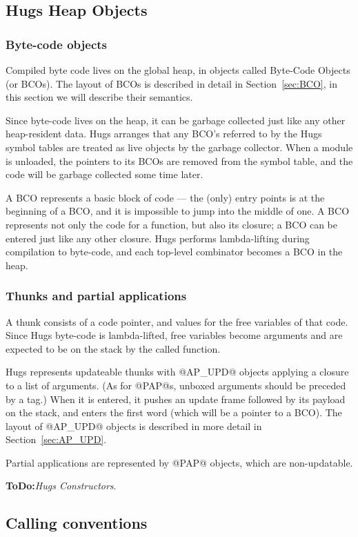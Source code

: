 \documentclass[11pt]{article}
\newcommand{\ToDo}[1]{{{\bf ToDo:}\sl #1}}
\newcommand{\secref}[1]{Section~\ref{sec:#1}}
\newcommand{\Subsection}[2]{\subsection{#1}\label{sec:#2}}
\begin{document}
\Subsection{Hugs Heap Objects}{hugs-heap-objects}

\subsubsection{Byte-code objects}

Compiled byte code lives on the global heap, in objects called
Byte-Code Objects (or BCOs).  The layout of BCOs is described in
detail in \secref{BCO}, in this section we will describe
their semantics.

Since byte-code lives on the heap, it can be garbage collected just
like any other heap-resident data.  Hugs arranges that any BCO's
referred to by the Hugs symbol tables are treated as live objects by
the garbage collector.  When a module is unloaded, the pointers to its
BCOs are removed from the symbol table, and the code will be garbage
collected some time later.

A BCO represents a basic block of code --- the (only) entry points is
at the beginning of a BCO, and it is impossible to jump into the
middle of one.  A BCO represents not only the code for a function, but
also its closure; a BCO can be entered just like any other closure.
Hugs performs lambda-lifting during compilation to byte-code, and each
top-level combinator becomes a BCO in the heap.


\subsubsection{Thunks and partial applications}

A thunk consists of a code pointer, and values for the free variables
of that code.  Since Hugs byte-code is lambda-lifted, free variables
become arguments and are expected to be on the stack by the called
function.

Hugs represents updateable thunks with @AP_UPD@ objects applying a closure
to a list of arguments.  (As for @PAP@s, unboxed arguments should be
preceded by a tag.)  When it is entered, it pushes an update frame
followed by its payload on the stack, and enters the first word (which
will be a pointer to a BCO).  The layout of @AP_UPD@ objects is described
in more detail in \secref{AP_UPD}.

Partial applications are represented by @PAP@ objects, which are
non-updatable.

\ToDo{Hugs Constructors}.

\Subsection{Calling conventions}{hugs-calling-conventions}
\end{document}
